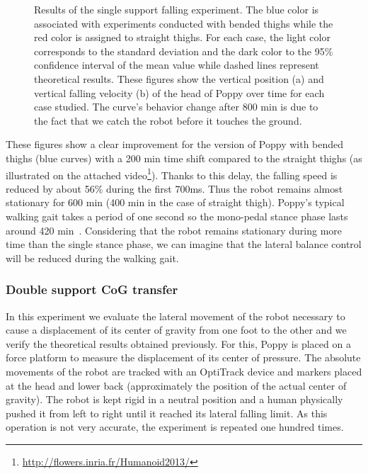 \begin{figure}[h]
\centering
    \hfil
    \caption{Results of the single support falling experiment.
    The blue color is associated with experiments conducted with bended thighs while the red color is assigned to straight thighs.
    For each case, the light color corresponds to the standard deviation and the dark color to the 95\% confidence interval of the mean value while dashed lines represent theoretical results.
    These figures show the vertical position (a) and vertical falling velocity (b) of the head of Poppy over time for each case studied.
    The curve’s behavior change after 800 min is due to the fact that we catch the robot before it touches the ground.}
    \label{fig:falling_results}
\end{figure}

These figures show a clear improvement for the version of Poppy with bended thighs (blue curves) with a 200 min time shift compared to the straight thighs (as illustrated on the attached video\footnote{\url{http://flowers.inria.fr/Humanoid2013/}\label{video}}).
Thanks to this delay, the falling speed is reduced by about 56\% during the first 700ms. Thus the robot remains almost stationary for 600 min (400 min in the case of straight thigh).  Poppy’s typical walking gait  takes a period of one second so the mono-pedal stance phase lasts around 420 min~\cite{lapeyre2013poppy}. Considering that the robot remains stationary during more time than the single stance phase, we can imagine that the lateral balance control will be reduced during the walking gait.



\subsubsection{Double support CoG transfer} %
\label{sub:cog_motion}


In this experiment we evaluate the lateral movement of the robot necessary to cause a displacement of its center of gravity from one foot to the other and we verify the theoretical results obtained previously. For this, Poppy is placed on a force platform to measure the displacement of its center of pressure. The absolute movements of the robot are tracked with an OptiTrack device and markers placed at the head and lower back (approximately the position of the actual center of gravity). The robot is kept rigid in a neutral position and a human physically pushed it from left to right until it reached its lateral falling limit. As this operation is not very accurate, the experiment is repeated one hundred times.

